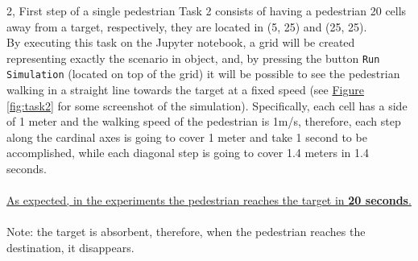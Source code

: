 \documentclass[10pt,a4paper]{article}
\begin{document}
\begin{task}{2, First step of a single pedestrian}
Task 2 consists of having a pedestrian 20 cells away from a target, respectively, they are located in (5, 25) and (25, 25).\\
By executing this task on the Jupyter notebook, a grid will be created representing exactly the scenario in object, and, by pressing the button \texttt{Run Simulation} (located on top of the grid) it will be possible to see the pedestrian walking in a straight line towards the target at a fixed speed (see \hyperref[fig:task2]{Figure \ref{fig:task2}} for some screenshot of the simulation).
Specifically, each cell has a side of 1 meter and the walking speed of the pedestrian is 1m/s, therefore, each step along the cardinal axes is going to cover 1 meter and take 1 second to be accomplished, while each diagonal step is going to cover 1.4 meters in 1.4 seconds.\\\\
\underline{As expected, in the experiments the pedestrian reaches the target in \textbf{20 seconds}.}\\\\
Note: the target is absorbent, therefore, when the pedestrian reaches the destination, it disappears.


\end{task}
\end{document}
